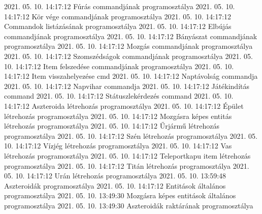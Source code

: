  {2021. 05. 10. 14:17:12} {Fúrás commandjának programosztálya}
 {2021. 05. 10. 14:17:12} {Kör vége commandjának programosztálya}
 {2021. 05. 10. 14:17:12} {Commandok listázásának programosztálya}
 {2021. 05. 10. 14:17:12} {Elbújás commandjának programosztálya}
 {2021. 05. 10. 14:17:12} {Bányászat commandjának programosztálya}
 {2021. 05. 10. 14:17:12} {Mozgás commandjának programosztálya}
 {2021. 05. 10. 14:17:12} {Szomszédságok commandjának programosztálya}
 {2021. 05. 10. 14:17:12} {Item felszedése commandjának programosztálya}
 {2021. 05. 10. 14:17:12} {Item visszahelyezése cmd}
 {2021. 05. 10. 14:17:12} {Naptávolság commandja}
 {2021. 05. 10. 14:17:12} {Napvihar commandja}
 {2021. 05. 10. 14:17:12} {Játékindítás command}
 {2021. 05. 10. 14:17:12} {Státuszlekérdezés command}
 {2021. 05. 10. 14:17:12} {Aszteroida létrehozás programosztálya}
 {2021. 05. 10. 14:17:12} {Épület létrehozás programosztálya}
 {2021. 05. 10. 14:17:12} {Mozgásra képes entitás létrehozás programosztálya}
 {2021. 05. 10. 14:17:12} {Űrjármű létrehozás programosztálya}
 {2021. 05. 10. 14:17:12} {Szén létrehozás programosztálya}
 {2021. 05. 10. 14:17:12} {Vízjég létrehozás programosztálya}
 {2021. 05. 10. 14:17:12} {Vas létrehozás programosztálya}
 {2021. 05. 10. 14:17:12} {Teleportkapu item létrehozás programosztálya}
 {2021. 05. 10. 14:17:12} {Titán létrehozás programosztálya}
 {2021. 05. 10. 14:17:12} {Urán létrehozás programosztálya}
 {2021. 05. 10. 13:59:48} {Aszteroidák programosztálya}
 {2021. 05. 10. 14:17:12} {Entitások általános programosztálya}
 {2021. 05. 10. 13:49:30} {Mozgásra képes entitások általános programosztálya}
 {2021. 05. 10. 13:49:30} {Aszteroidák raktárának programosztálya}

